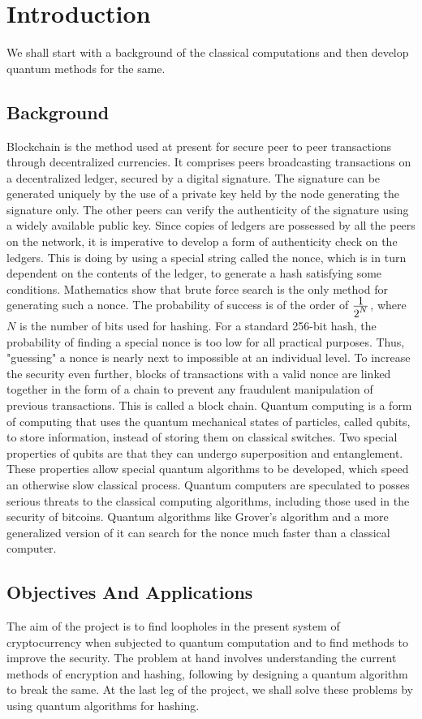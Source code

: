 \section{Introduction}
We shall start with a background of the classical computations and then develop quantum methods for the same.
\subsection{Background}
Blockchain is the method used at present for secure peer to peer transactions through decentralized currencies\cite{btc}. It comprises peers broadcasting transactions on a decentralized ledger, secured by a digital signature. The signature can be generated uniquely by the use of a private key held by the node generating the signature only. The other peers can verify the authenticity of the signature using a widely available public key. Since copies of ledgers are possessed by all the peers on the network, it is imperative to develop a form of authenticity check on the ledgers. This is doing by using a special string called the nonce, which is in turn dependent on the contents of the ledger, to generate a hash satisfying some conditions. Mathematics show that brute force search is the only method for generating such a nonce. The probability of success is of the order of $\frac{\displaystyle 1}{\displaystyle 2^N}$, where $N$ is the number of bits used for hashing. For a standard 256-bit hash, the probability of finding a special nonce is too low for all practical purposes. Thus, "guessing" a nonce is nearly next to impossible at an individual level. To increase the security even further, blocks of transactions with a valid nonce are linked together in the form of a chain to prevent any fraudulent manipulation of previous transactions. This is called a block chain.
Quantum computing is a form of computing that uses the quantum mechanical states of particles, called qubits, to store information, instead of storing them on classical switches. Two special properties of qubits are that they can undergo superposition and entanglement. These properties allow special quantum algorithms to be developed, which speed an otherwise slow classical process. Quantum computers are speculated to posses serious threats to the classical computing algorithms\cite{enc_br}, including those used in the security of bitcoins. Quantum algorithms like Grover's algorithm and a more generalized version of it can search for the nonce much faster than a classical computer.
\subsection{Objectives And Applications}
The aim of the project is to find loopholes in the present system of cryptocurrency\cite{btc} when subjected to quantum computation and to find methods to improve the security. The problem at hand involves understanding the current methods of encryption and hashing, following by designing a quantum algorithm to break the same. At the last leg of the project, we shall solve these problems by using quantum algorithms for hashing.

